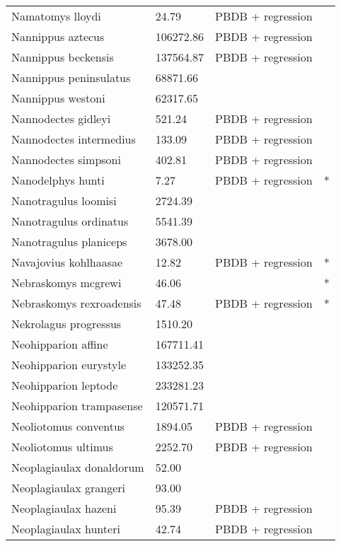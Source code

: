 \documentclass{article}
\begin{document}
\begin{center}
\begin{longtable}{p{} p{} p{} p{}}
    Namatomys lloydi & 24.79 & PBDB + regression &  \\ 
    Nannippus aztecus & 106272.86 & PBDB + regression &  \\ 
    Nannippus beckensis & 137564.87 & PBDB + regression &  \\ 
    Nannippus peninsulatus & 68871.66 & \cite{Tomiya2013} &  \\ 
    Nannippus westoni & 62317.65 & \cite{Tomiya2013} &  \\ 
    Nannodectes gidleyi & 521.24 & PBDB + regression &  \\ 
    Nannodectes intermedius & 133.09 & PBDB + regression &  \\ 
    Nannodectes simpsoni & 402.81 & PBDB + regression &  \\ 
    Nanodelphys hunti & 7.27 & PBDB + regression & * \\ 
    Nanotragulus loomisi & 2724.39 & \cite{Tomiya2013} &  \\ 
    Nanotragulus ordinatus & 5541.39 & \cite{Tomiya2013} &  \\ 
    Nanotragulus planiceps & 3678.00 & \cite{McKenna2011} &  \\ 
    Navajovius kohlhaasae & 12.82 & PBDB + regression & * \\ 
    Nebraskomys mcgrewi & 46.06 & \cite{Tomiya2013} & * \\ 
    Nebraskomys rexroadensis & 47.48 & PBDB + regression & * \\ 
    Nekrolagus progressus & 1510.20 & \cite{Tomiya2013} &  \\ 
    Neohipparion affine & 167711.41 & \cite{Tomiya2013} &  \\ 
    Neohipparion eurystyle & 133252.35 & \cite{Tomiya2013} &  \\ 
    Neohipparion leptode & 233281.23 & \cite{Tomiya2013} &  \\ 
    Neohipparion trampasense & 120571.71 & \cite{Tomiya2013} &  \\ 
    Neoliotomus conventus & 1894.05 & PBDB + regression &  \\ 
    Neoliotomus ultimus & 2252.70 & PBDB + regression &  \\ 
    Neoplagiaulax donaldorum & 52.00 & \cite{Wilson2012} &  \\ 
    Neoplagiaulax grangeri & 93.00 & \cite{Wilson2012} &  \\ 
    Neoplagiaulax hazeni & 95.39 & PBDB + regression &  \\ 
    Neoplagiaulax hunteri & 42.74 & PBDB + regression &  \\ 

\end{longtable}
\end{center}
\end{document}

